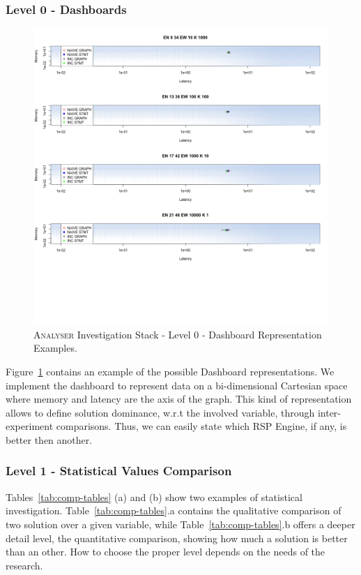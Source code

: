 \subsubsection{Level 0 - Dashboards}\label{sec:impl-level0}

\begin{figure}[h!tbp]
  \centering
	\includegraphics[width=0.6\linewidth]{images/dashboard-example}
	\caption[\textsc{Analyser} Investigation Stack - Level 0 -  Dashboard Representation Examples]{\textsc{Analyser} Investigation Stack - Level 0 -  Dashboard Representation Examples.}
  	\label{fig:dashboard-example}
\end{figure}

\noindent Figure~\ref{fig:dashboard-example} contains an example of the possible Dashboard representations. We implement the dashboard to represent data on a bi-dimensional Cartesian space where memory and latency are the axis of the graph. This kind of representation allows to define solution dominance, w.r.t the involved variable, through inter-experiment comparisons. Thus, we can easily state which RSP Engine, if any, is better then another.

\subsubsection{Level 1 - Statistical Values Comparison}\label{sec:impl-level1}

Tables~\ref{tab:comp-tables} (a) and (b) show two examples of statistical investigation. Table~\ref{tab:comp-tables}.a contains the qualitative comparison of two solution over a given variable, while Table~\ref{tab:comp-tables}.b offers a deeper detail level, the quantitative comparison, showing how much a solution is better than an other. How to choose the proper level depends on the needs of the research.

